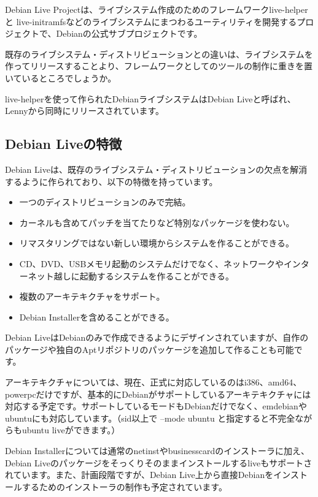 \documentclass[mingoth,a4paper]{jsarticle}
\begin{document}
Debian Live Projectは、ライブシステム作成のためのフレームワークlive-helperと
live-initramfsなどのライブシステムにまつわるユーティリティを開発するプロ
ジェクトで、Debianの公式サブプロジェクトです。

既存のライブシステム・ディストリビューションとの違いは、ライブシステムを
作ってリリースすることより、フレームワークとしてのツールの制作に重きを置
いているところでしょうか。

live-helperを使って作られたDebianライブシステムはDebian Liveと呼ばれ、Lennyから同時にリリースされています。

\subsection{Debian Liveの特徴}
Debian Liveは、既存のライブシステム・ディストリビューションの欠点を解消するように作られており、以下の特徴を持っています。

\begin{itemize}
 \item 一つのディストリビューションのみで完結。
 \item カーネルも含めてパッチを当てたりなど特別なパッケージを使わない。
 \item リマスタリングではない新しい環境からシステムを作ることができる。
 \item CD、DVD、USBメモリ起動のシステムだけでなく、ネットワークやインターネット越しに起動するシステムを作ることができる。
 \item 複数のアーキテキクチャをサポート。
 \item Debian Installerを含めることができる。
\end{itemize}

Debian LiveはDebianのみで作成できるようにデザインされていますが、自作のパッケージや独自のAptリポジトリのパッケージを追加して作ることも可能です。

アーキテキクチャについては、現在、正式に対応しているのはi386、amd64、
powerpcだけですが、基本的にDebianがサポートしているアーキテキクチャには
対応する予定です。サポートしているモードもDebianだけでなく、emdebianや
ubuntuにも対応しています。（sid以上で --mode
ubuntu と指定すると不完全ながらもubuntu liveができます。）

Debian Installerについては通常のnetinstやbusinesscardのインストーラに加え、Debian Liveのパッケージをそっくりそのままインストールするliveもサポートされています。また、計画段階ですが、Debian Live上から直接Debianをインストールするためのインストーラの制作も予定されています。
\end{document}
